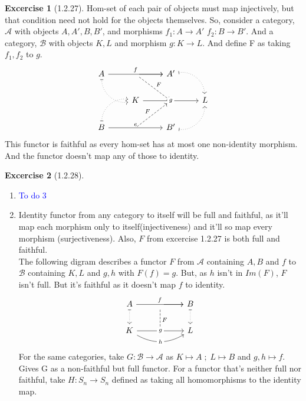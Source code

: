 \documentclass{article}
\theoremstyle{definition}
\newtheorem*{excercise}{Excercise}
\begin{document}
\begin{excercise}[1.2.27] %
	Hom-set of each pair of objects must map injectively, but that condition need not hold for the objects themselves.
	So, consider a category, $\mathcal{A}$ with objects $A,A',B,B'$, and morphisms $f_1:A\rightarrow A'$
	$f_2:B\rightarrow B'$. And a category, $\mathcal{B} $ with objects $K,L$ and morphism $g:K\rightarrow L$. And define F as taking $f_1,f_2$ to $g$.
	\[ \begin{tikzcd}
		A \arrow[rr, "f"] \arrow[rd, dotted, maps to, bend right=49] & {} \arrow[r] \arrow[rd, "F", dashed] & A' \arrow[rd, dotted, maps to, bend left=49] &   \\
& K \arrow[rr, "g" description]        & {}                                          & L \\
		B \arrow[rr, "e"] \arrow[ru, dotted, maps to, bend left=49]  & {} \arrow[ru, "F", dashed]           & B' \arrow[ru, dotted,maps to , bend right=49]         &
	\end{tikzcd}\]
	This functor is faithful as every hom-set has at most one non-identity morphism. And the  functor  doesn't map any of those to identity.

\end{excercise}
\begin{excercise}[1.2.28] %
	\begin{enumerate}[label=(\alph*)]
		\item \textcolor{blue}{To do 3}
		\item Identity functor from any category to itself will be full and faithful, as it'll map each morphism only to itself(injectiveness) and it'll so map every morphism (surjectiveness).
Also, $F$ from excercise 1.2.27 is both full and faithful. \\
The following digram describes a functor $F$ from $\mathcal{A} $ containing $A,B$ and $f$ to $\mathcal{B} $ containing $K,L$ and $g,h$ with $F(f) = g$. But, as $h$ isn't in $Im(F)$, $F$ isn't full. But it's faithful as it doesn't map $f$ to identity.
\[
\begin{tikzcd}
A \arrow[rr, "f"] \arrow[d, dotted, maps to]                          & {} \arrow[r] \arrow[d, "F", dashed] & B \arrow[d, dotted, maps to] \\
K \arrow[rr, "g" description] \arrow[rr, "h" description, bend right] & {}                                                      & L
\end{tikzcd}\]
For the same categories, take $G:\mathcal{B} \rightarrow \mathcal{A} $ as $K \mapsto A\; ; \; L \mapsto B $
and $g,h \mapsto f $. Gives G as a non-faithful but full functor. For a functor that's neither full nor faithful, take $H: S_n \rightarrow S_n$ defined as taking all homomorphisms to the identity map.

	\end{enumerate}
\end{excercise}
\end{document}
